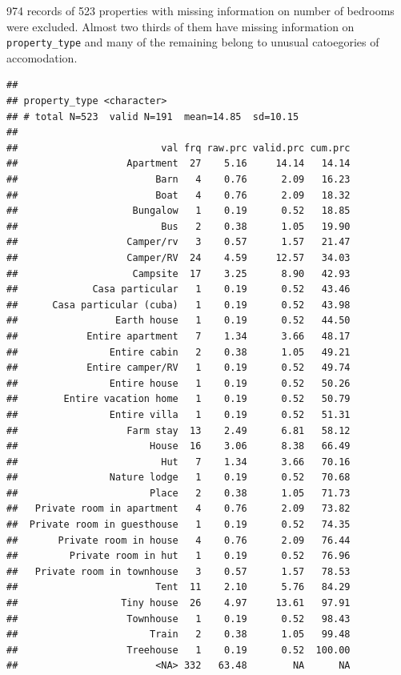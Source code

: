 \documentclass[]{article}
\begin{document}
974 records of 523 properties with missing information on number of
bedrooms were excluded. Almost two thirds of them have missing
information on \texttt{property\_type} and many of the remaining belong
to unusual catoegories of accomodation.

\begin{verbatim}
## 
## property_type <character>
## # total N=523  valid N=191  mean=14.85  sd=10.15
## 
##                         val frq raw.prc valid.prc cum.prc
##                   Apartment  27    5.16     14.14   14.14
##                        Barn   4    0.76      2.09   16.23
##                        Boat   4    0.76      2.09   18.32
##                    Bungalow   1    0.19      0.52   18.85
##                         Bus   2    0.38      1.05   19.90
##                   Camper/rv   3    0.57      1.57   21.47
##                   Camper/RV  24    4.59     12.57   34.03
##                    Campsite  17    3.25      8.90   42.93
##             Casa particular   1    0.19      0.52   43.46
##      Casa particular (cuba)   1    0.19      0.52   43.98
##                 Earth house   1    0.19      0.52   44.50
##            Entire apartment   7    1.34      3.66   48.17
##                Entire cabin   2    0.38      1.05   49.21
##            Entire camper/RV   1    0.19      0.52   49.74
##                Entire house   1    0.19      0.52   50.26
##        Entire vacation home   1    0.19      0.52   50.79
##                Entire villa   1    0.19      0.52   51.31
##                   Farm stay  13    2.49      6.81   58.12
##                       House  16    3.06      8.38   66.49
##                         Hut   7    1.34      3.66   70.16
##                Nature lodge   1    0.19      0.52   70.68
##                       Place   2    0.38      1.05   71.73
##   Private room in apartment   4    0.76      2.09   73.82
##  Private room in guesthouse   1    0.19      0.52   74.35
##       Private room in house   4    0.76      2.09   76.44
##         Private room in hut   1    0.19      0.52   76.96
##   Private room in townhouse   3    0.57      1.57   78.53
##                        Tent  11    2.10      5.76   84.29
##                  Tiny house  26    4.97     13.61   97.91
##                   Townhouse   1    0.19      0.52   98.43
##                       Train   2    0.38      1.05   99.48
##                   Treehouse   1    0.19      0.52  100.00
##                        <NA> 332   63.48        NA      NA
\end{verbatim}
\end{document}
